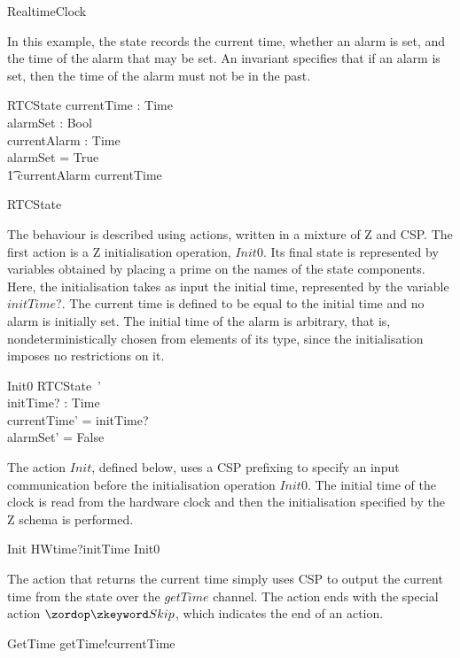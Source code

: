 \documentclass[a4paper,10pt]{report}
\begin{document}
%
\begin{circus}
  \circprocess RealtimeClock \circdef \circbegin
\end{circus}
%
In this example, the state records the current time, whether an alarm is set,
and the time of the alarm that may be set. An invariant specifies that if an
alarm is set, then the time of the alarm must not be in the past.
%
\begin{schema}{RTCState}
  currentTime  : Time \\
  alarmSet     : Bool \\
  currentAlarm : Time \\
\where
  alarmSet = True \implies \\
  \t1 currentAlarm \geq currentTime
\end{schema}
\begin{circusaction}
  \circstate RTCState
\end{circusaction}
%
The behaviour is described using actions, written in a mixture of Z and CSP. The
first action is a Z initialisation operation, $Init0$.  Its final state is
represented by variables obtained by placing a prime on the names of the state
components.  Here, the initialisation takes as input the initial time,
represented by the variable $initTime?$. The current time is defined to be equal
to the initial time and no alarm is initially set. The initial time of the alarm
is arbitrary, that is, nondeterministically chosen from elements of its type,
since the initialisation imposes no restrictions on it.
%
\begin{schema}{Init0}
  RTCState~' \\
  initTime? : Time \\
\where
  currentTime' = initTime? \\
  alarmSet' = False \\
\end{schema}
%
The action $Init$, defined below, uses a CSP prefixing to specify an input
communication before the initialisation operation $Init0$.  The initial time of
the clock is read from the hardware clock and then the initialisation specified
by the Z schema is performed.
%
\begin{circusaction}
  Init \circdef HWtime?initTime \then Init0
\end{circusaction}
%
The action that returns the current time simply uses CSP to output the current
time from the state over the $getTime$ channel. The action ends with the special
action $\Skip$, which indicates the end of an action.
%
\begin{circusaction}
  GetTime \circdef getTime!currentTime \then \Skip
\end{circusaction}
\end{document}
